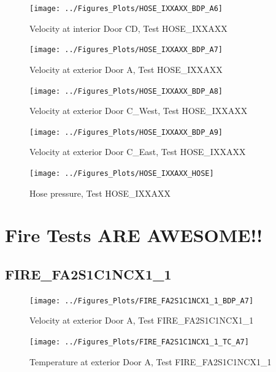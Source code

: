 \documentclass[11pt,oneside]{book}
\begin{document}
\begin{figure}[!ht]
\texttt{[image: ../Figures\_Plots/HOSE\_IXXAXX\_BDP\_A6]}
\caption{Velocity at interior Door CD, Test HOSE\_IXXAXX}
\label{fig:HOSE_IXXAXX_BDP_A6}
\end{figure}

\begin{figure}[!ht]
\texttt{[image: ../Figures\_Plots/HOSE\_IXXAXX\_BDP\_A7]}
\caption{Velocity at exterior Door A, Test HOSE\_IXXAXX}
\label{fig:HOSE_IXXAXX_BDP_A7}
\end{figure}

\begin{figure}[!ht]
\texttt{[image: ../Figures\_Plots/HOSE\_IXXAXX\_BDP\_A8]}
\caption{Velocity at exterior Door C\_West, Test HOSE\_IXXAXX}
\label{fig:HOSE_IXXAXX_BDP_A8}
\end{figure}

\begin{figure}[!ht]
\texttt{[image: ../Figures\_Plots/HOSE\_IXXAXX\_BDP\_A9]}
\caption{Velocity at exterior Door C\_East, Test HOSE\_IXXAXX}
\label{fig:HOSE_IXXAXX_BDP_A9}
\end{figure}

\begin{figure}[!ht]
\texttt{[image: ../Figures\_Plots/HOSE\_IXXAXX\_HOSE]}
\caption{Hose pressure, Test HOSE\_IXXAXX}
\label{fig:HOSE_IXXAXX_HOSE}
\end{figure}


\clearpage


\section{Fire Tests ARE AWESOME!!}

\subsection{FIRE\_FA2S1C1NCX1\_1}

\begin{figure}[!ht]
\texttt{[image: ../Figures\_Plots/FIRE\_FA2S1C1NCX1\_1\_BDP\_A7]}
\caption{Velocity at exterior Door A, Test FIRE\_FA2S1C1NCX1\_1}
\label{fig:FIRE_FA2S1C1NCX1_1_BDP_A7}
\end{figure}

\begin{figure}[!ht]
\texttt{[image: ../Figures\_Plots/FIRE\_FA2S1C1NCX1\_1\_TC\_A7]}
\caption{Temperature at exterior Door A, Test FIRE\_FA2S1C1NCX1\_1}
\label{fig:FIRE_FA2S1C1NCX1_1_TC_A7}
\end{figure}
\end{document}
